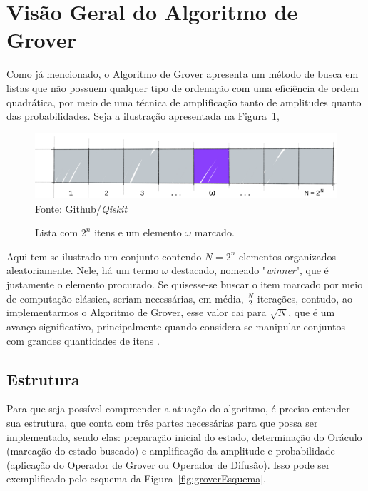 \section{Visão Geral do Algoritmo de Grover}
\label{sec:algGroverGeral}

Como j\'{a} mencionado, o Algoritmo de Grover apresenta um m\'{e}todo de busca em listas que n\~{a}o possuem qualquer tipo de ordenaç\~{a}o com uma efici\^{e}ncia de ordem quadr\'{a}tica, por meio de uma t\'{e}cnica de amplificaç\~{a}o tanto de amplitudes quanto das probabilidades.
Seja a ilustraç\~{a}o apresentada na Figura~\ref{fig:itemMarcado},

\begin{figure}[ht!]
    \centering
    \caption{Lista com $2^{n}$ itens e um elemento $\omega$ marcado.}
    \includegraphics[scale=.6]{Imagens/markedItem.png}\\
    {\small Fonte: Github/\emph{Qiskit}}
    \label{fig:itemMarcado}
\end{figure}

Aqui tem-se ilustrado um conjunto contendo $N = 2^n$ elementos organizados aleatoriamente. Nele, h\'{a} um termo $\omega$ destacado, nomeado "\textit{winner}", que \'{e} justamente o elemento procurado. Se quisesse-se buscar o item marcado por meio de computaç\~{a}o cl\'{a}ssica, seriam necess\'{a}rias, em m\'{e}dia, $\frac{N}{2}$ iterações, contudo, ao implementarmos o Algoritmo de Grover, esse valor cai para $\sqrt{N}$, que \'{e} um avanço significativo, principalmente quando considera-se manipular conjuntos com grandes quantidades de itens \cite{qiskit_GroverNotebook}.

\subsection{Estrutura}
\label{subsec:estruturaAlg}

Para que seja poss\'{i}vel compreender a atuaç\~{a}o do algoritmo, \'{e} preciso entender sua estrutura, que conta com tr\^{e}s partes necess\'{a}rias para que possa ser implementado, sendo elas: preparaç\~{a}o inicial do estado, determinaç\~{a}o do Or\'{a}culo (marcaç\~{a}o do estado buscado) e amplificaç\~{a}o da amplitude e probabilidade (aplicaç\~{a}o do Operador de Grover ou Operador de Difus\~{a}o). Isso pode ser exemplificado pelo esquema da Figura~\ref{fig:groverEsquema}.

